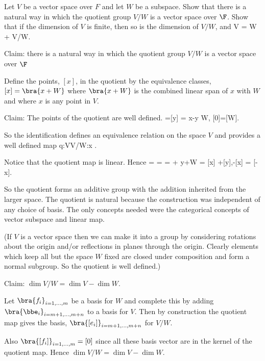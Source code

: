 \begin{problem}
Let $V$ be a vector space over $F$ and let $W$ be a subspace. Show that there is a natural way in which the quotient group $V/W$ is a vector space over $\F$. Show that if the dimension of $V$ is finite, then so is the dimension of $V/W$, and 
\be
\dim V = \dim W + \dim V/W.
\ee
\end{problem}

\begin{solution}[\bf Solution.]
Claim: there is a natural way in which the quotient group $V/W$ is a vector space over $\F$

Define the points, $[x]$, in the quotient by the equivalence classes, $[x] = \bra{x+W}$ where $\bra{x+W}$ is the combined linear span of $x$ with $W$ and where $x$ is any point in $V$.

Claim: The points of the quotient are well defined.
\be
[x] =[y]  =  x-y \in W, [0]=[W].
\ee

So the identification defines an equivalence relation on the space $V$ and provides a well defined map
\be
q:V\to V/W:x \mapsto [x].
\ee

Notice that the quotient map is linear. Hence
\be
[x+y] =  =  =  + {y+W} = [x] +[y],\quad -[x] = [-x].
\ee

So the quotient forms an additive group with the addition inherited from the larger space. The quotient is natural because the construction was independent of any choice of basis. The only concepts needed were the categorical concepts of vector subspace and linear map.

(If $V$ is a vector space then we can make it into a group by considering rotations about the origin and/or reflections in planes through the origin. Clearly elements which keep all but the space $W$ fixed are closed under composition and form a normal subgroup. So the quotient is well defined.)

Claim: $\dim V/W = \dim V - \dim W$.

Let $\bra{f_i}_{i=1,\dots,m}$ be a basis for $W$ and complete this by adding $\bra{\bbe_i}_{i=m+1,\dots,m+n}$ to a basis for $V$. Then by construction the quotient map gives the basis, $\bra{[e_i]}_{i=m+1,\dots,m+n}$ for $V/W$.

Also $\bra{[f_i]}_{i=1,\dots,m} = [0]$ since all these basis vector are in the kernel of the quotient map. Hence $\dim V/W = \dim V - \dim W$.
\end{solution}



